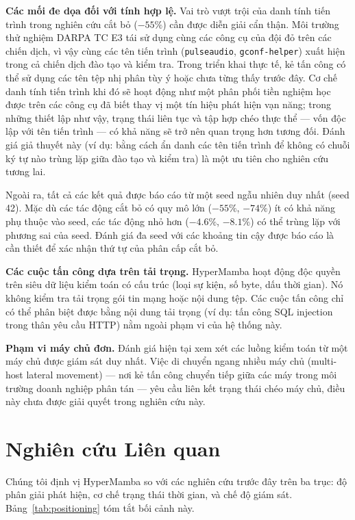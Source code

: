 \documentclass[letterpaper,twocolumn,10pt]{article}
\begin{document}
\textbf{Các mối đe dọa đối với tính hợp lệ.} Vai trò vượt trội của danh tính tiến trình trong nghiên cứu cắt bỏ ($-55\%$) cần được diễn giải cẩn thận. Môi trường thử nghiệm DARPA TC E3 tái sử dụng cùng các công cụ của đội đỏ trên các chiến dịch, vì vậy cùng các tên tiến trình (\texttt{pulseaudio}, \texttt{gconf-helper}) xuất hiện trong cả chiến dịch đào tạo và kiểm tra. Trong triển khai thực tế, kẻ tấn công có thể sử dụng các tên tệp nhị phân tùy ý hoặc chưa từng thấy trước đây. Cơ chế danh tính tiến trình khi đó sẽ hoạt động như một phân phối tiền nghiệm học được trên các công cụ đã biết thay vị một tín hiệu phát hiện vạn năng; trong những thiết lập như vậy, trạng thái liên tục và tập hợp chéo thực thể --- vốn độc lập với tên tiến trình --- có khả năng sẽ trở nên quan trọng hơn tương đối. Đánh giá giả thuyết này (ví dụ: bằng cách ẩn danh các tên tiến trình để không có chuỗi ký tự nào trùng lặp giữa đào tạo và kiểm tra) là một ưu tiên cho nghiên cứu tương lai.

Ngoài ra, tất cả các kết quả được báo cáo từ một seed ngẫu nhiên duy nhất (seed 42). Mặc dù các tác động cắt bỏ có quy mô lớn ($-55\%$, $-74\%$) ít có khả năng phụ thuộc vào seed, các tác động nhỏ hơn ($-4.6\%$, $-8.1\%$) có thể trùng lặp với phương sai của seed. Đánh giá đa seed với các khoảng tin cậy được báo cáo là cần thiết để xác nhận thứ tự của phân cấp cắt bỏ.

\textbf{Các cuộc tấn công dựa trên tải trọng.} HyperMamba hoạt động độc quyền trên siêu dữ liệu kiểm toán có cấu trúc (loại sự kiện, số byte, dấu thời gian). Nó không kiểm tra tải trọng gói tin mạng hoặc nội dung tệp. Các cuộc tấn công chỉ có thể phân biệt được bằng nội dung tải trọng (ví dụ: tấn công SQL injection trong thân yêu cầu HTTP) nằm ngoài phạm vi của hệ thống này.

\textbf{Phạm vi máy chủ đơn.} Đánh giá hiện tại xem xét các luồng kiểm toán từ một máy chủ được giám sát duy nhất. Việc di chuyển ngang nhiều máy chủ (multi-host lateral movement) --- nơi kẻ tấn công chuyển tiếp giữa các máy trong môi trường doanh nghiệp phân tán --- yêu cầu liên kết trạng thái chéo máy chủ, điều này chưa được giải quyết trong nghiên cứu này.

\section{Nghiên cứu Liên quan}
\label{sec:related_work}

Chúng tôi định vị HyperMamba so với các nghiên cứu trước đây trên ba trục: độ phân giải phát hiện, cơ chế trạng thái thời gian, và chế độ giám sát. Bảng~\ref{tab:positioning} tóm tắt bối cảnh này.
\end{document}
